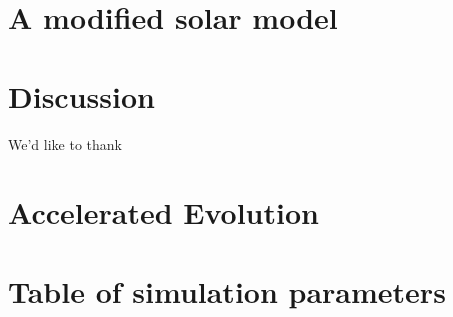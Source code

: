 \documentclass{aastex631}
\begin{document}
\section{A modified solar model}
\label{sec:solar_model}

\section{Discussion}
\label{sec:discussion}

\begin{acknowledgments}
We'd like to thank
\end{acknowledgments}


\appendix

\section{Accelerated Evolution}
\label{app:accelerated_evolution}

\section{Table of simulation parameters}
\label{app:simulation_table}







\end{document}

